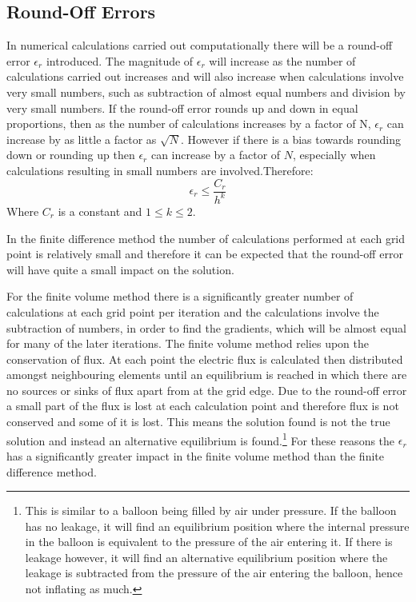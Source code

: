 \documentclass[aps,twocolumn,pre,nofootinbib,10pt]{revtex4-1}
\begin{document}
\subsection{Round-Off Errors}

In numerical calculations carried out computationally there will be a round-off error \(\epsilon_r\) introduced. The magnitude of \(\epsilon_r\) will increase as the number of calculations carried out increases and will also increase when calculations involve very small numbers, such as subtraction of almost equal numbers and division by very small numbers. If the round-off error rounds up and down in equal proportions, then as the number of calculations increases by a factor of N, \(\epsilon_r\) can increase by as little a factor as \(\sqrt{N}.\) However if there is a bias towards rounding down or rounding up then \(\epsilon_r\) can increase by a factor of \(N\), especially when calculations resulting in small numbers are involved.Therefore: 
\[\epsilon_r \leq \frac{C_r}{h^k} \]\cite[p.~29]{recipes_c}
Where \(C_r\) is a constant and \(1 \leq k \leq 2\).

In the finite difference method the number of calculations performed at each grid point is relatively small and therefore it can be expected that the round-off error will have quite a small impact on the solution. 

For the finite volume method there is a significantly greater number of calculations at each grid point per iteration and the calculations involve the subtraction of numbers, in order to find the gradients, which will be almost equal for many of the later iterations. The finite volume method relies upon the conservation of flux. At each point the electric flux is calculated then distributed amongst neighbouring elements until an equilibrium is reached in which there are no sources or sinks of flux apart from at the grid edge. Due to the round-off error a small part of the flux is lost at each calculation point and therefore flux is not conserved and some of it is lost. This means the solution found is not the true solution and instead an alternative equilibrium is found.\footnote{This is similar to a balloon being filled by air under pressure. If the balloon has no leakage, it will find an equilibrium position where the internal pressure in the balloon is equivalent to the pressure of the air entering it. If 
there is leakage however, it will find an alternative equilibrium position where the leakage is subtracted from the pressure of the air entering the balloon, hence not inflating as much.}  For these reasons the \(\epsilon_r\) has a significantly greater impact in the finite volume method than the finite difference method.
\end{document}
